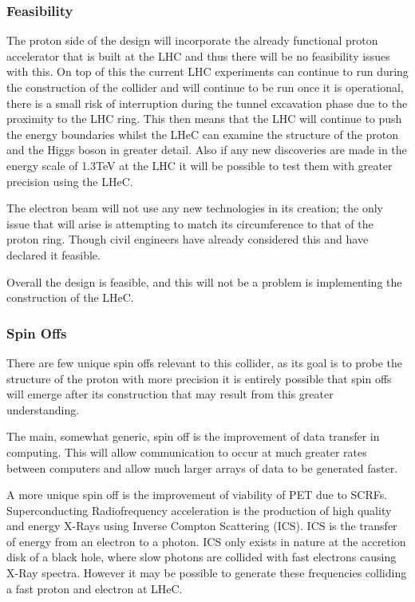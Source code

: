 \subsubsection{Feasibility}

The proton side of the design will incorporate the already functional proton accelerator that is built at the LHC and thus there will be no feasibility issues with this. On top of this the current LHC experiments can continue to run during the construction of the collider and will continue to be run once it is operational, there is a small risk of interruption during the tunnel excavation phase due to the proximity to the LHC ring. This then means that the LHC will continue to push the energy boundaries whilst the LHeC can examine the structure of the proton and the Higgs boson in greater detail. Also if any new discoveries are made in the energy scale of 1.3TeV at the LHC it will be possible to test them with greater precision using the LHeC.
 
The electron beam will not use any new technologies in its creation; the only issue that will arise is attempting to match its circumference to that of the proton ring. Though civil engineers have already considered this and have declared it feasible. \cite{LHeC:Report}
 
Overall the design is feasible, and this will not be a problem is implementing the construction of the LHeC.
 
\subsubsection{Spin Offs}

There are few unique spin offs relevant to this collider, as its goal is to probe the structure of the proton with more precision it is entirely possible that spin offs will emerge after its construction that may result from this greater understanding.
 
The main, somewhat generic, spin off is the improvement of data transfer in computing. This will allow communication to occur at much greater rates between computers and allow much larger arrays of data to be generated faster.
 
A more unique spin off is the improvement of viability of PET due to SCRFs. Superconducting Radiofrequency acceleration is the production of high quality and energy X-Rays using Inverse Compton Scattering (ICS). ICS is the transfer of energy from an electron to a photon. ICS only exists in nature at the accretion disk of a black hole, where slow photons are collided with fast electrons causing X-Ray spectra. However it may be possible to generate these frequencies colliding a fast proton and electron at LHeC.
 
